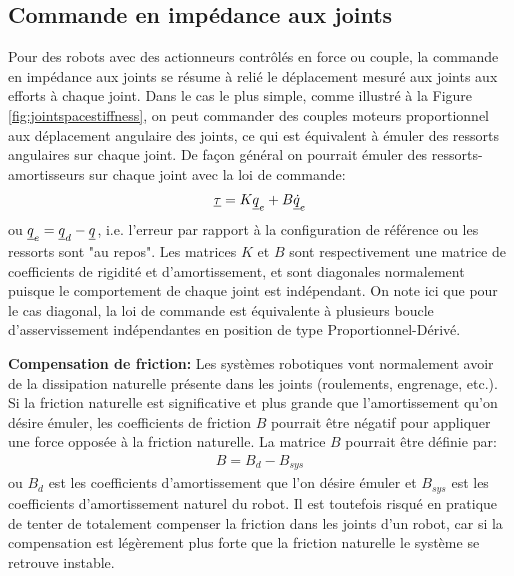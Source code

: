 \subsection{Commande en impédance aux joints}
\label{sec:jointimpcontrol}

Pour des robots avec des actionneurs contrôlés en force ou couple, la commande en impédance aux joints se résume à relié le déplacement mesuré aux joints aux efforts à chaque joint. Dans le cas le plus simple, comme illustré à la Figure \ref{fig:jointspacestiffness}, on peut commander des couples moteurs proportionnel aux déplacement angulaire des joints, ce qui est équivalent à émuler des ressorts angulaires sur chaque joint. De façon général on pourrait émuler des ressorts-amortisseurs sur chaque joint avec la loi de commande:
\begin{align}
\underline{\tau} = K \underline{q}_e + B \underline{\dot{q}}_e
\label{eq:jointspaceimpe}
\end{align}
ou $\underline{q}_e = \underline{q}_d - \underline{q}$, i.e. l'erreur par rapport à la configuration de référence ou les ressorts sont "au repos". Les matrices $K$ et $B$ sont respectivement une matrice de coefficients de rigidité et d'amortissement, et sont diagonales normalement puisque le comportement de chaque joint est indépendant. On note ici que pour le cas diagonal, la loi de commande est équivalente à plusieurs boucle d'asservissement indépendantes en position de type Proportionnel-Dérivé. 

\textbf{Compensation de friction: } Les systèmes robotiques vont normalement avoir de la dissipation naturelle présente dans les joints (roulements, engrenage, etc.). Si la friction naturelle est significative et plus grande que l'amortissement qu'on désire émuler, les coefficients de friction $B$ pourrait être négatif pour appliquer une force opposée à la friction naturelle. La matrice $B$ pourrait être définie par:
\begin{align}
B = B_{d} - B_{sys}
\end{align}
ou $B_{d}$ est les coefficients d'amortissement que l'on désire émuler et $B_{sys}$ est les coefficients d'amortissement naturel du robot. Il est toutefois risqué en pratique de tenter de totalement compenser la friction dans les joints d'un robot, car si la compensation est légèrement plus forte que la friction naturelle le système se retrouve instable. 

